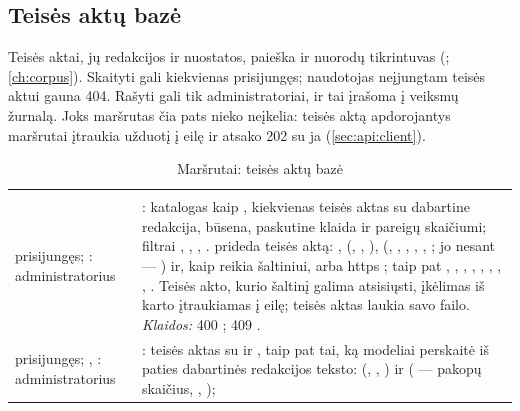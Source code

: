\subsection{Teisės aktų bazė}\label{sec:api:corpus}

Teisės aktai, jų redakcijos ir nuostatos, paieška ir nuorodų tikrintuvas
(; \cref{ch:corpus}). Skaityti gali kiekvienas prisijungęs; naudotojas
neįjungtam teisės aktui gauna 404. Rašyti gali tik administratoriai, ir tai įrašoma į veiksmų žurnalą.
Joks maršrutas čia pats nieko neįkelia: teisės aktą apdorojantys maršrutai įtraukia užduotį į eilę
ir atsako 202 su ja (\cref{sec:api:client}).

\begin{xltabular}{\textwidth}{@{}L{19mm}Y@{}}
\caption{Maršrutai: teisės aktų bazė}\label{tab:api:corpus}\\
\toprule {} &  \\ \midrule \endfirsthead
\toprule {} &  \\ \midrule \endhead
\bottomrule \endlastfoot
{}
prisijungęs; : administratorius & : katalogas kaip , kiekvienas
  teisės aktas su dabartine redakcija, būsena, paskutine klaida ir pareigų skaičiumi; filtrai
  , , , .  prideda teisės aktą:
  ,  (, , ), 
  (, , , , , ; jo nesant
  --- ) ir, kaip reikia šaltiniui,  arba https ;
  taip pat , , , , ,
  , , , . Teisės akto, kurio
  šaltinį galima atsisiųsti, įkėlimas iš karto įtraukiamas į eilę;  teisės aktas
  laukia savo failo. \emph{Klaidos:} 400 ; 409 . \\
\addlinespace
{}
prisijungęs; , : administratorius & : teisės aktas su
   ir , taip pat tai, ką modeliai perskaitė iš paties dabartinės
  redakcijos teksto:  (, , ) ir
   ( --- pakopų skaičius, , );

\end{xltabular}
